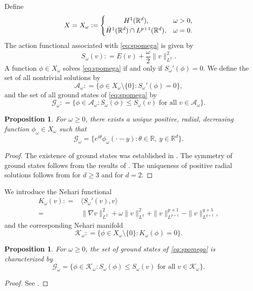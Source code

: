 \documentclass[12pt, a4paper, reqno]{amsart}
\numberwithin{equation}{section}
\newtheorem{proposition}[theorem]{Proposition}
\theoremstyle{definition}
\theoremstyle{remark}
\newcommand{\R}{\mathbb R}
\newcommand{\ce}{\mathrel{\mathop:}=}
\begin{document}
Define
\[  X=X_\omega\ce
    \begin{cases}
    \hfil H^1(\R^d), & \omega>0,\\
    \dot H^1(\R^d)\cap L^{p+1}(\R^d), & \omega=0.
    \end{cases}  \]
The action functional associated with \eqref{eq:spomega} is given by
\[  S_\omega(v)
    \ce E(v)+\frac{\omega}{2}\|v\|_{L^2}^2.  \]
A function $\phi\in X_\omega$ solves \eqref{eq:spomega} if and only if $S_\omega'(\phi)=0$.
We define the set of all nontrivial solutions by
\[  \mathcal{A}_\omega
    \ce \{\phi\in X_\omega\setminus\{0\}:
    S_\omega'(\phi)=0\},  \]
and the set of all ground states of \eqref{eq:spomega} by
\[  \mathcal{G}_\omega
    \ce \{\phi\in\mathcal{A}_\omega:
    S_\omega(\phi)\le S_\omega(v) \text{ for all } v\in\mathcal{A}_\omega\}.  \] 
\begin{proposition} \label{prop:uniq}
For $\omega\ge 0$, there exists a unique positive, radial, decreasing function $\phi_\omega\in X_\omega$ such that
\[  \mathcal{G}_\omega
    =\{e^{i\theta}\phi_\omega(\cdot-y):
    \theta\in\R,\: y\in\R^d\}.  \]
\end{proposition}
\begin{proof}
The existence of ground states was established in \cite{BL83}. The symmetry of ground states follows from the results of \cite{GNN81, LN93}. The uniqueness of positive radial solutions follows from \cite{ST00} for $d\geq 3$ and \cite{PS98} for $d=2$. 
\end{proof}

We introduce the Nehari functional
\begin{align*}
    K_\omega(v)
    \ce {}&\langle S_\omega'(v), v\rangle
\\  ={}&\|\nabla v\|_{L^2}^2
    +\omega\|v\|_{L^2}^2
    +\|v\|_{L^{p+1}}^{p+1}
    -\|v\|_{L^{q+1}}^{q+1},
\end{align*}
and the corresponding Nehari manifold
\[  \mathcal{K}_\omega
    \ce \{\phi\in X_\omega\setminus\{0\}:
    K_\omega(\phi)=0\}.  \]

\begin{proposition}\label{prop:nehari}
For $\omega\ge 0$, the set of ground states of \eqref{eq:spomega} is characterized by
\[  \mathcal{G}_\omega
    =\{\phi\in\mathcal{K}_\omega:
    S_\omega(\phi)\le S_\omega(v) \text{ for all } v\in\mathcal{K}_\omega\}.  \]
\end{proposition}
\begin{proof}
See \cite[Theorem~2.1]{FH21}.
\end{proof}
\end{document}
